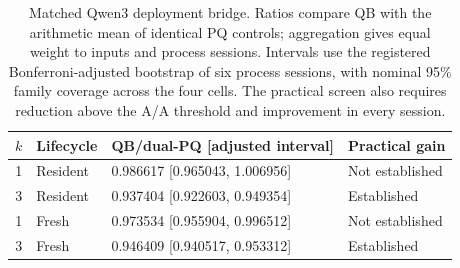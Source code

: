 \begin{table}[t]\centering\small
\caption{Matched Qwen3 deployment bridge. Ratios compare QB with the arithmetic mean of identical PQ controls; aggregation gives equal weight to inputs and process sessions. Intervals use the registered Bonferroni-adjusted bootstrap of six process sessions, with nominal 95\% family coverage across the four cells. The practical screen also requires reduction above the A/A threshold and improvement in every session.}
\label{tab:nativebridge}
\begin{tabular}{@{}rlll@{}}\toprule
$k$ & Lifecycle & QB/dual-PQ [adjusted interval] & Practical gain\\\midrule
1 & Resident & 0.986617 [0.965043, 1.006956] & Not established\\
3 & Resident & 0.937404 [0.922603, 0.949354] & Established\\
1 & Fresh & 0.973534 [0.955904, 0.996512] & Not established\\
3 & Fresh & 0.946409 [0.940517, 0.953312] & Established\\
\bottomrule\end{tabular}
\end{table}
